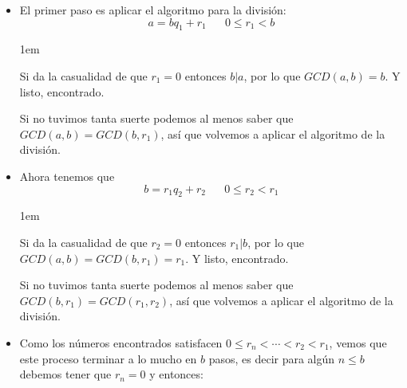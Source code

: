 \documentclass[12pt]{report}                                    %
\newenvironment{SmallIndentation}[1][0.75em]                    %
    {\begin{adjustwidth}{#1}{}\begin{footnotesize}}                 %
    {\end{footnotesize}\end{adjustwidth}}                           %
\DeclareMathOperator \Space {\quad}                             %
\begin{document}
            \begin{itemize}
                \item
                    El primer paso es aplicar el algoritmo para la división:
                    \begin{equation*}
                        a = bq_1 +r_1 \Space 0 \leq r_1 < b
                    \end{equation*}

                    \begin{SmallIndentation}[1em]
                        Si da la casualidad de que $r_1 = 0$ entonces $b|a$, por lo
                        que $GCD(a,b) = b$. Y listo, encontrado.

                        Si no tuvimos tanta suerte podemos al menos saber que
                        $GCD(a,b) = GCD(b,r_1)$, así que volvemos a aplicar el
                        algoritmo de la división.

                    \end{SmallIndentation}

                    
                \item
                    Ahora tenemos que 
                    \begin{equation*}
                        b = r_1q_2 +r_2 \Space 0 \leq r_2 < r_1
                    \end{equation*}

                    \begin{SmallIndentation}[1em]
                        Si da la casualidad de que $r_2 = 0$ entonces $r_1|b$, por lo
                        que $GCD(a,b) = GCD(b,r_1)=r_1$. Y listo, encontrado.

                        Si no tuvimos tanta suerte podemos al menos saber que
                        $GCD(b,r_1) = GCD(r_1,r_2)$, así que volvemos a aplicar el
                        algoritmo de la división.

                    \end{SmallIndentation}

                    


                \item
                    Como los números encontrados satisfacen $0 \leq r_n < \cdots < r_2 < r_1$,
                    vemos que este proceso terminar a lo mucho en $b$ pasos, es decir para algún
                    $n \leq b$ debemos tener que $r_n=0$ y entonces:


\end{itemize}
\end{document}
